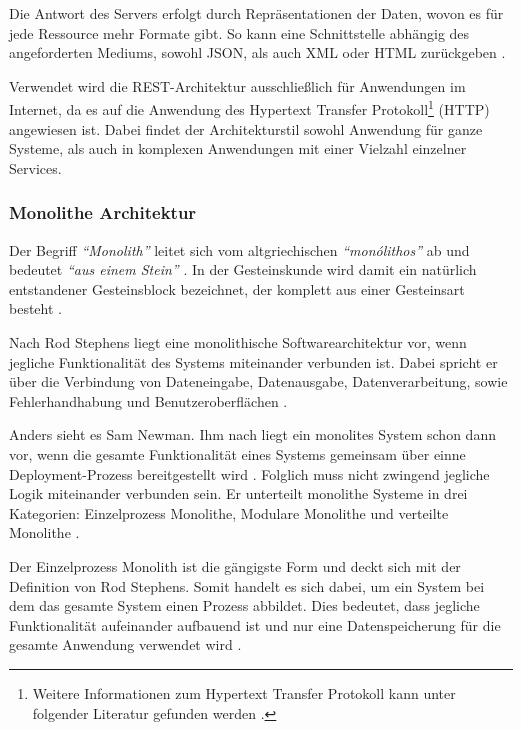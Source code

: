 Die Antwort des Servers erfolgt durch Repräsentationen der Daten, wovon es für jede Ressource mehr Formate gibt. So kann eine Schnittstelle abhängig des angeforderten Mediums, sowohl JSON­, als auch XML­ oder HTML zurückgeben \parencite[vgl.][S. 128]{starke_effektive_2015}.

Verwendet wird die REST-Architektur ausschließlich für Anwendungen im Internet, da es auf die Anwendung des Hypertext Transfer Protokoll\footnote{Weitere Informationen zum Hypertext Transfer Protokoll kann unter folgender Literatur gefunden werden \parencite{leach_hypertext_2020}.} (HTTP) angewiesen ist. Dabei findet der Architekturstil sowohl Anwendung für ganze Systeme, als auch in komplexen Anwendungen mit einer Vielzahl einzelner Services.

\subsubsection{Monolithe Architektur}

Der Begriff \textit{\enquote{Monolith}} leitet sich vom altgriechischen \textit{\enquote{monólithos}} ab und bedeutet \textit{\enquote{aus einem Stein}} \parencites[vlg.][]{duden_nodate}[vgl.][]{dwds_nodate}. In der Gesteinskunde wird damit ein natürlich entstandener Gesteinsblock bezeichnet, der komplett aus einer Gesteinsart besteht \parencite[vgl.][]{dwds_nodate}.

Nach Rod Stephens liegt eine monolithische Softwarearchitektur vor, wenn jegliche Funktionalität des Systems miteinander verbunden ist. Dabei spricht er über die Verbindung von Dateneingabe, Datenausgabe, Datenverarbeitung, sowie Fehlerhandhabung und Benutzeroberflächen \parencite[vgl.][S. 94]{stephens_beginning_2015}.

Anders sieht es Sam Newman. Ihm nach liegt ein monolites System schon dann vor, wenn die gesamte Funktionalität eines Systems gemeinsam über einne Deployment-Prozess bereitgestellt wird \parencite[vgl.][Kap. 2.2]{newman_monolith_2019}. Folglich muss nicht zwingend jegliche Logik miteinander verbunden sein. Er unterteilt monolithe Systeme in drei Kategorien: Einzelprozess Monolithe, Modulare Monolithe und verteilte Monolithe \parencite[vgl.][Kap. 2.2]{newman_monolith_2019}.

Der Einzelprozess Monolith ist die gängigste Form und deckt sich mit der Definition von Rod Stephens. Somit handelt es sich dabei, um ein System bei dem das gesamte System einen Prozess abbildet. Dies bedeutet, dass jegliche Funktionalität aufeinander aufbauend ist und nur eine Datenspeicherung für die gesamte Anwendung verwendet wird \parencite[vgl.][Kap. 2.2.1]{newman_monolith_2019}.

